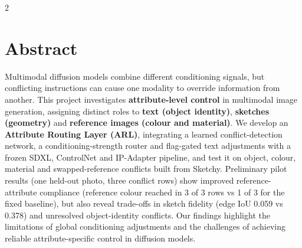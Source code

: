 \documentclass[a1,portrait]{a0poster}
\begin{document}
\begin{minipage}[c]{\linewidth}
\begin{framed}
\begin{multicols}{2}
\section*{Abstract}
Multimodal diffusion models combine different conditioning signals, but conflicting instructions can cause one modality to override information from another. This project investigates \textbf{attribute-level control} in multimodal image generation, assigning distinct roles to \textbf{text (object identity)}, \textbf{sketches (geometry)} and \textbf{reference images (colour and material)}. We develop an \textbf{Attribute Routing Layer (ARL)}, integrating a learned conflict-detection network, a conditioning-strength router and flag-gated text adjustments with a frozen SDXL, ControlNet and IP-Adapter pipeline, and test it on object, colour, material and swapped-reference conflicts built from Sketchy. Preliminary pilot results (one held-out photo, three conflict rows) show improved reference-attribute compliance (reference colour reached in 3 of 3 rows vs 1 of 3 for the fixed baseline), but also reveal trade-offs in sketch fidelity (edge IoU 0.059 vs 0.378) and unresolved object-identity conflicts. Our findings highlight the limitations of global conditioning adjustments and the challenges of achieving reliable attribute-specific control in diffusion models.


\end{multicols}
\end{framed}
\end{minipage}
\end{document}
